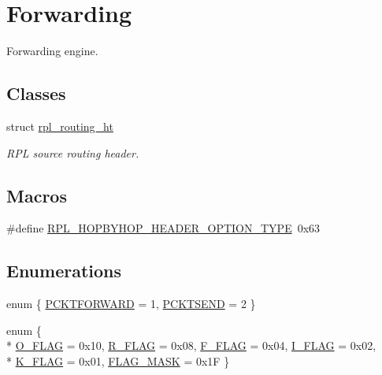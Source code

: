 \hypertarget{group___forwarding}{}\section{Forwarding}
\label{group___forwarding}


Forwarding engine.  


\subsection*{Classes}
\begin{DoxyCompactItemize}
\item 
struct \hyperlink{structrpl__routing__ht}{rpl\+\_\+routing\+\_\+ht}
\begin{DoxyCompactList}\small\item\em R\+PL source routing header. \end{DoxyCompactList}\end{DoxyCompactItemize}
\subsection*{Macros}
\begin{DoxyCompactItemize}
\item 
\#define \hyperlink{group___forwarding_gae88a822ccea38205da29ece34f87e337}{R\+P\+L\+\_\+\+H\+O\+P\+B\+Y\+H\+O\+P\+\_\+\+H\+E\+A\+D\+E\+R\+\_\+\+O\+P\+T\+I\+O\+N\+\_\+\+T\+Y\+PE}~0x63
\end{DoxyCompactItemize}
\subsection*{Enumerations}
\begin{DoxyCompactItemize}
\item 
enum \{ \hyperlink{group___forwarding_ggac8347fa324c6412b168db6df3464ad80ab7e5cdc1dd813d3171f816d522e21d53}{P\+C\+K\+T\+F\+O\+R\+W\+A\+RD} = 1, 
\hyperlink{group___forwarding_ggac8347fa324c6412b168db6df3464ad80ad43ec09324c0ce7faa1f3391e6359586}{P\+C\+K\+T\+S\+E\+ND} = 2
 \}
\item 
enum \{ \\*
\hyperlink{group___forwarding_ggabe821d0fac05333be298917dcb50ee1da3acc8206f3fc926cd7ccc97c4b75abdd}{O\+\_\+\+F\+L\+AG} = 0x10, 
\hyperlink{group___forwarding_ggabe821d0fac05333be298917dcb50ee1dad79fe8d92ad805c22d20c6df03e21e69}{R\+\_\+\+F\+L\+AG} = 0x08, 
\hyperlink{group___forwarding_ggabe821d0fac05333be298917dcb50ee1da60665c7ea4f40351f4c2cc206025c0bd}{F\+\_\+\+F\+L\+AG} = 0x04, 
\hyperlink{group___forwarding_ggabe821d0fac05333be298917dcb50ee1da65ced0c1066ebce2044125f1e601925b}{I\+\_\+\+F\+L\+AG} = 0x02, 
\\*
\hyperlink{group___forwarding_ggabe821d0fac05333be298917dcb50ee1dae206c979eb3766327cdd1f32760f96c7}{K\+\_\+\+F\+L\+AG} = 0x01, 
\hyperlink{group___forwarding_ggabe821d0fac05333be298917dcb50ee1dafb72b2d48c5f64f19615eed846270086}{F\+L\+A\+G\+\_\+\+M\+A\+SK} = 0x1F
 \}
\end{DoxyCompactItemize}
